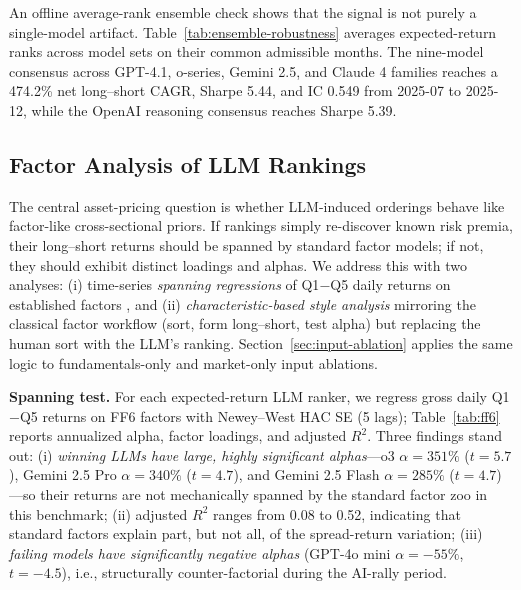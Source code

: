 

An offline average-rank ensemble check shows that the signal is not purely a single-model artifact.
Table~\ref{tab:ensemble-robustness} averages expected-return ranks across model sets on their common admissible months.
The nine-model consensus across GPT-4.1, o-series, Gemini 2.5, and Claude 4 families reaches a 474.2\% net long--short CAGR, Sharpe 5.44, and IC 0.549 from 2025-07 to 2025-12, while the OpenAI reasoning consensus reaches Sharpe 5.39.



\subsection{Factor Analysis of LLM Rankings}
\label{sec:factor}

The central asset-pricing question is whether LLM-induced orderings behave like factor-like cross-sectional priors.
If rankings simply re-discover known risk premia, their long--short returns should be spanned by standard factor models; if not, they should exhibit distinct loadings and alphas.
We address this with two analyses: (i) time-series \emph{spanning regressions} of Q1$-$Q5 daily returns on established factors \citep{fama1993common,carhart1997persistence,fama2015fivefactor}, and (ii) \emph{characteristic-based style analysis} mirroring the classical factor workflow (sort, form long--short, test alpha) but replacing the human sort with the LLM's ranking.
Section~\ref{sec:input-ablation} applies the same logic to fundamentals-only and market-only input ablations.

\textbf{Spanning test.}
For each expected-return LLM ranker, we regress gross daily Q1$-$Q5 returns on FF6 factors \citep{french2025library} with Newey--West HAC SE (5 lags); Table~\ref{tab:ff6} reports annualized alpha, factor loadings, and adjusted $R^2$.
Three findings stand out: (i) \emph{winning LLMs have large, highly significant alphas}---o3 $\alpha=351\%$ ($t=5.7$), Gemini 2.5 Pro $\alpha=340\%$ ($t=4.7$), and Gemini 2.5 Flash $\alpha=285\%$ ($t=4.7$)---so their returns are not mechanically spanned by the standard factor zoo in this benchmark;
(ii) adjusted $R^2$ ranges from 0.08 to 0.52, indicating that standard factors explain part, but not all, of the spread-return variation;
(iii) \emph{failing models have significantly negative alphas} (GPT-4o mini $\alpha=-55\%$, $t=-4.5$), i.e., structurally counter-factorial during the AI-rally period.

